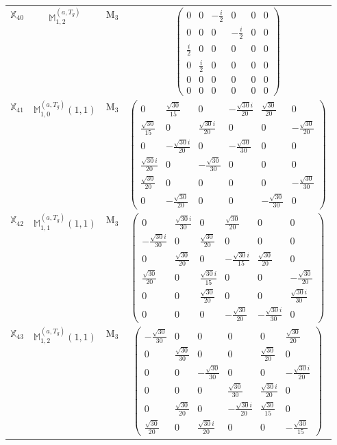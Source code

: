 \documentclass[fleqn,10pt,landscape]{article}
\begin{document}
\begin{itemize}
\begin{center}
\begin{longtable}{c|c|c|c}
$ \mathbb{X}_{40} $ & $\mathbb{M}_{1,2}^{(a,T_{g})}$ & M$_{3}$ & $\begin{pmatrix} 0 & 0 & - \frac{i}{2} & 0 & 0 & 0 \\ 0 & 0 & 0 & - \frac{i}{2} & 0 & 0 \\ \frac{i}{2} & 0 & 0 & 0 & 0 & 0 \\ 0 & \frac{i}{2} & 0 & 0 & 0 & 0 \\ 0 & 0 & 0 & 0 & 0 & 0 \\ 0 & 0 & 0 & 0 & 0 & 0 \end{pmatrix}$ \\
$ \mathbb{X}_{41} $ & $\mathbb{M}_{1,0}^{(a,T_{g})}(1,1)$ & M$_{3}$ & $\begin{pmatrix} 0 & \frac{\sqrt{30}}{15} & 0 & - \frac{\sqrt{30} i}{20} & \frac{\sqrt{30}}{20} & 0 \\ \frac{\sqrt{30}}{15} & 0 & \frac{\sqrt{30} i}{20} & 0 & 0 & - \frac{\sqrt{30}}{20} \\ 0 & - \frac{\sqrt{30} i}{20} & 0 & - \frac{\sqrt{30}}{30} & 0 & 0 \\ \frac{\sqrt{30} i}{20} & 0 & - \frac{\sqrt{30}}{30} & 0 & 0 & 0 \\ \frac{\sqrt{30}}{20} & 0 & 0 & 0 & 0 & - \frac{\sqrt{30}}{30} \\ 0 & - \frac{\sqrt{30}}{20} & 0 & 0 & - \frac{\sqrt{30}}{30} & 0 \end{pmatrix}$ \\
$ \mathbb{X}_{42} $ & $\mathbb{M}_{1,1}^{(a,T_{g})}(1,1)$ & M$_{3}$ & $\begin{pmatrix} 0 & \frac{\sqrt{30} i}{30} & 0 & \frac{\sqrt{30}}{20} & 0 & 0 \\ - \frac{\sqrt{30} i}{30} & 0 & \frac{\sqrt{30}}{20} & 0 & 0 & 0 \\ 0 & \frac{\sqrt{30}}{20} & 0 & - \frac{\sqrt{30} i}{15} & \frac{\sqrt{30}}{20} & 0 \\ \frac{\sqrt{30}}{20} & 0 & \frac{\sqrt{30} i}{15} & 0 & 0 & - \frac{\sqrt{30}}{20} \\ 0 & 0 & \frac{\sqrt{30}}{20} & 0 & 0 & \frac{\sqrt{30} i}{30} \\ 0 & 0 & 0 & - \frac{\sqrt{30}}{20} & - \frac{\sqrt{30} i}{30} & 0 \end{pmatrix}$ \\
$ \mathbb{X}_{43} $ & $\mathbb{M}_{1,2}^{(a,T_{g})}(1,1)$ & M$_{3}$ & $\begin{pmatrix} - \frac{\sqrt{30}}{30} & 0 & 0 & 0 & 0 & \frac{\sqrt{30}}{20} \\ 0 & \frac{\sqrt{30}}{30} & 0 & 0 & \frac{\sqrt{30}}{20} & 0 \\ 0 & 0 & - \frac{\sqrt{30}}{30} & 0 & 0 & - \frac{\sqrt{30} i}{20} \\ 0 & 0 & 0 & \frac{\sqrt{30}}{30} & \frac{\sqrt{30} i}{20} & 0 \\ 0 & \frac{\sqrt{30}}{20} & 0 & - \frac{\sqrt{30} i}{20} & \frac{\sqrt{30}}{15} & 0 \\ \frac{\sqrt{30}}{20} & 0 & \frac{\sqrt{30} i}{20} & 0 & 0 & - \frac{\sqrt{30}}{15} \end{pmatrix}$ \\

\end{longtable}
\end{center}
\end{itemize}
\end{document}
